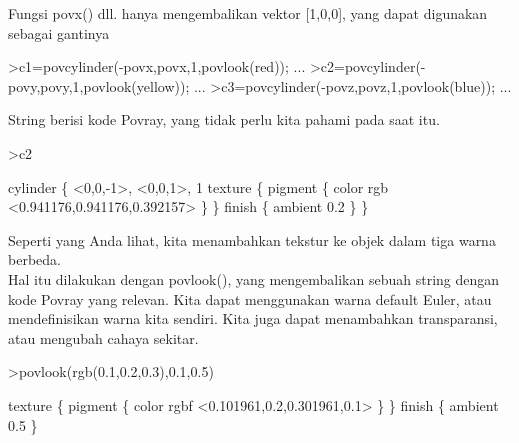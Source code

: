 \documentclass[a4paper,10pt]{article}
\begin{document}
\begin{eulernotebook}
\begin{eulercomment}
\begin{eulercomment}
\begin{eulercomment}
\begin{eulercomment}
\begin{eulercomment}
\begin{eulercomment}
\begin{eulercomment}
\begin{eulercomment}
\begin{eulercomment}
\begin{eulercomment}
\begin{eulercomment}
Fungsi povx() dll. hanya mengembalikan vektor [1,0,0], yang dapat
digunakan sebagai gantinya
\end{eulercomment}
\begin{eulerprompt}
>c1=povcylinder(-povx,povx,1,povlook(red)); ...
>c2=povcylinder(-povy,povy,1,povlook(yellow)); ...
>c3=povcylinder(-povz,povz,1,povlook(blue)); ...
\end{eulerprompt}
\begin{eulercomment}
String berisi kode Povray, yang tidak perlu kita pahami pada saat itu.
\end{eulercomment}
\begin{eulerprompt}
>c2
\end{eulerprompt}
\begin{euleroutput}
  cylinder \{ <0,0,-1>, <0,0,1>, 1
   texture \{ pigment \{ color rgb <0.941176,0.941176,0.392157> \}  \} 
   finish \{ ambient 0.2 \} 
   \}
\end{euleroutput}
\begin{eulercomment}
Seperti yang Anda lihat, kita menambahkan tekstur ke objek dalam tiga
warna berbeda.\\
Hal itu dilakukan dengan povlook(), yang mengembalikan sebuah string
dengan kode Povray yang relevan. Kita dapat menggunakan warna default
Euler, atau mendefinisikan warna kita sendiri. Kita juga dapat
menambahkan transparansi, atau mengubah cahaya sekitar.
\end{eulercomment}
\begin{eulerprompt}
>povlook(rgb(0.1,0.2,0.3),0.1,0.5)
\end{eulerprompt}
\begin{euleroutput}
   texture \{ pigment \{ color rgbf <0.101961,0.2,0.301961,0.1> \}  \} 
   finish \{ ambient 0.5 \} 
  
\end{euleroutput}
\begin{eulerttcomment}
 

\end{eulerttcomment}
\end{eulercomment}
\end{eulercomment}
\end{eulercomment}
\end{eulercomment}
\end{eulercomment}
\end{eulercomment}
\end{eulercomment}
\end{eulercomment}
\end{eulercomment}
\end{eulercomment}
\end{eulernotebook}
\end{document}
